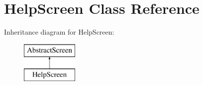 \hypertarget{class_help_screen}{}\section{Help\+Screen Class Reference}
\label{class_help_screen}
Inheritance diagram for Help\+Screen\+:\begin{figure}[H]
\begin{center}
\leavevmode
\includegraphics[height=2.000000cm]{class_help_screen}
\end{center}
\end{figure}
